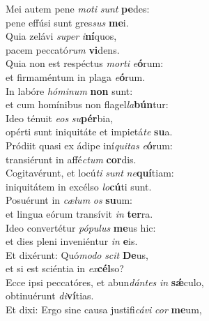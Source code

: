 \evenverse Mei autem pene \textit{mo}\textit{ti} \textit{sunt} \textbf{pe}des:~\*\\
\evenverse pene effúsi sunt gres\textit{sus} \textbf{me}i.\\
\oddverse Quia zelávi \textit{su}\textit{per} \textit{i}\textbf{ní}quos,~\*\\
\oddverse pacem peccató\textit{rum} \textbf{vi}dens.\\
\evenverse Quia non est respéctus \textit{mor}\textit{ti} \textit{e}\textbf{ó}rum:~\*\\
\evenverse et firmaméntum in plaga \textit{e}\textbf{ó}rum.\\
\oddverse In labóre \textit{hó}\textit{mi}\textit{num} \textbf{non} sunt:~\*\\
\oddverse et cum homínibus non flagel\textit{la}\textbf{bún}tur:\\
\evenverse Ideo ténuit \textit{e}\textit{os} \textit{su}\textbf{pér}bia,~\*\\
\evenverse opérti sunt iniquitáte et impietá\textit{te} \textbf{su}a.\\
\oddverse Pródiit quasi ex ádipe iní\textit{qui}\textit{tas} \textit{e}\textbf{ó}rum:~\*\\
\oddverse transiérunt in affé\textit{ctum} \textbf{cor}dis.\\
\evenverse Cogitavérunt, et locú\textit{ti} \textit{sunt} \textit{ne}\textbf{quí}tiam:~\*\\
\evenverse iniquitátem in excélso \textit{lo}\textbf{cú}ti sunt.\\
\oddverse Posuérunt in \textit{cæ}\textit{lum} \textit{os} \textbf{su}um:~\*\\
\oddverse et lingua eórum transívit \textit{in} \textbf{ter}ra.\\
\evenverse Ideo convertétur \textit{pó}\textit{pu}\textit{lus} \textbf{me}us hic:~\*\\
\evenverse et dies pleni inveniéntur \textit{in} \textbf{e}is.\\
\oddverse Et dixérunt: Quó\textit{mo}\textit{do} \textit{scit} \textbf{De}us,~\*\\
\oddverse et si est sciéntia in \textit{ex}\textbf{cél}so?\\
\evenverse Ecce ipsi peccatóres, et abun\textit{dán}\textit{tes} \textit{in} \textbf{sǽ}culo,~\*\\
\evenverse obtinuérunt \textit{di}\textbf{ví}tias.\\
\oddverse Et dixi: Ergo sine causa justifi\textit{cá}\textit{vi} \textit{cor} \textbf{me}um,~\*\\
